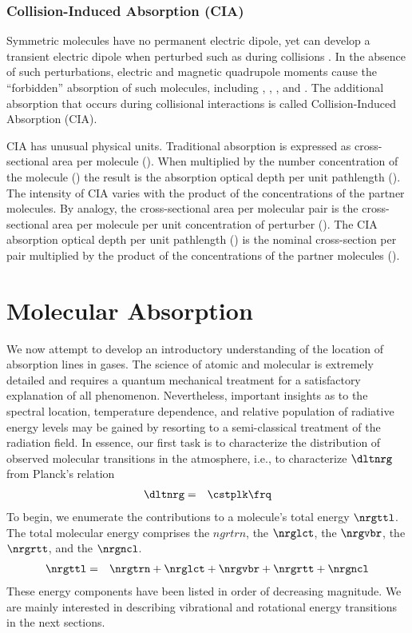 \documentclass[12pt]{article}
\begin{document}
\subsubsection[Collision-Induced Absorption (CIA)]{Collision-Induced Absorption (CIA)}\label{sxn:cia}
Symmetric molecules have no permanent electric dipole, yet can develop
a transient electric dipole when perturbed such as during collisions
\citep{Fro06,RGR12}.
In the absence of such perturbations, electric and magnetic quadrupole
moments cause the ``forbidden'' absorption of such molecules,
including \Hd, \Od, \Nd, and \CHq.
The additional absorption that occurs during collisional interactions
is called Collision-Induced Absorption (CIA).

CIA has unusual physical units.
Traditional absorption is expressed as cross-sectional area per
molecule (\mSxmlc).
When multiplied by the number concentration of the molecule (\mlcxmC)
the result is the absorption optical depth per unit pathlength (\xm).
The intensity of CIA varies with the product of the concentrations of
the partner molecules.
By analogy, the cross-sectional area per molecular pair is the
cross-sectional area per molecule per unit concentration of perturber
(\mFxmlcS). 
The CIA absorption optical depth per unit pathlength (\xm) is the
nominal cross-section per pair multiplied by the product of the 
concentrations of the partner molecules (\mlcSxmSix).

\section[Molecular Absorption]{Molecular Absorption}\label{sxn:mlc_abs}

We now attempt to develop an introductory understanding of
the location of absorption lines in gases.
The science of atomic and molecular  is extremely
detailed and requires a quantum mechanical treatment for a
satisfactory explanation of all phenomenon.
Nevertheless, important insights as to the spectral location, 
temperature dependence, and relative population of radiative energy
levels may be gained by resorting to a semi-classical treatment of 
the radiation field.
In essence, our first task is to characterize the distribution of 
observed molecular transitions in the atmosphere, i.e., to
characterize $\dltnrg$ from Planck's relation
\begin{eqnarray}
\dltnrg & = & \cstplk \frq
\label{eqn:mlc_abs_dfn}
\end{eqnarray}
To begin, we enumerate the contributions to a molecule's total energy
$\nrgttl$.
The total molecular energy comprises the  $ngrtrn$, the  $\nrglct$, 
the  $\nrgvbr$, 
the  $\nrgrtt$, and the  $\nrgncl$.
\begin{eqnarray}
\label{eqn:nrg_ttl_dfn}
\nrgttl & = & \nrgtrn + \nrglct + \nrgvbr + \nrgrtt + \nrgncl
\end{eqnarray}
These energy components have been listed in order of decreasing
magnitude. 
We are mainly interested in describing vibrational and rotational
energy transitions in the next sections.
\end{document}
